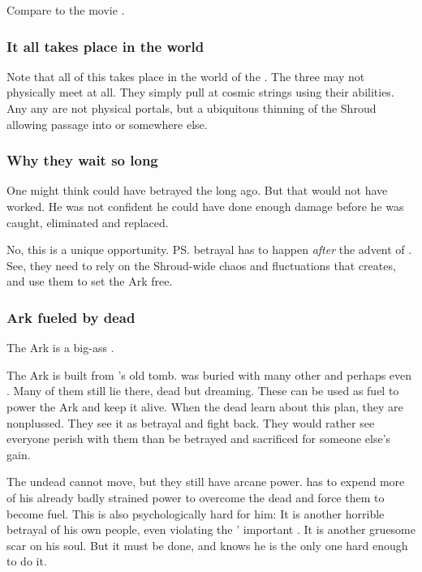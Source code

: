 Compare to the movie \cite{Movie:Watchmen}. 





\subsubsection{It all takes place in the \matrix{} world}
Note that all of this takes place in the world of the \matrices. 
The three may not physically meet at all. 
They simply pull at cosmic strings using their \vertex{} abilities. 
Any any  are not physical portals, but a ubiquitous thinning of the Shroud allowing passage into \Erebos{} or somewhere else. 





\subsubsection{Why they wait so long}
One might think \Azraid{} could have betrayed the \banes{} long ago. 
But that would not have worked. 
He was not confident he could have done enough damage before he was caught, eliminated and replaced. 

No, this is a unique opportunity. 
\ps{\Azraid} betrayal has to happen \emph{after} the advent of \Lithrim. 
See, they need to rely on the Shroud-wide chaos and fluctuations that \Lithrim{} creates, and use them to set the Ark free. 





\subsubsection{Ark fueled by dead \ophidians}
The Ark is a big-ass . 

The Ark is built from \Sethicus's old tomb. 
\Sethicus was buried with many other \ophidians and perhaps even \dragons.
Many of them still lie there, dead but dreaming. 
These can be used as fuel to power the Ark and keep it alive. 
When the dead learn about this plan, they are nonplussed. 
They see it as betrayal and fight back. 
They would rather see everyone perish with them than be betrayed and sacrificed for someone else's gain. 

The undead cannot move, but they still have arcane power. 
\Ishnaruchaefir has to expend more of his already badly strained power to overcome the dead and force them to become fuel. 
This is also psychologically hard for him: 
It is another horrible betrayal of his own people, even violating the \dragons' important . 
It is another gruesome scar on his soul. 
But it must be done, and \Ishnaruchaefir knows he is the only one hard enough to do it. 

